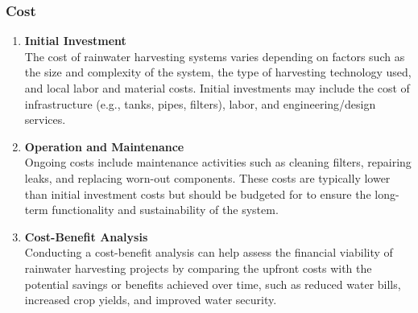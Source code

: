 \documentclass[12pt]{article}
\begin{document}
	\subsubsection{Cost}
	\begin{enumerate}[label=\textbf{\arabic*.}]
		\item \textbf{Initial Investment} \\
		The cost of rainwater harvesting systems varies depending on factors such as the size and complexity of the system, the type of harvesting technology used, and local labor and material costs. Initial investments may include the cost of infrastructure (e.g., tanks, pipes, filters), labor, and engineering/design services.

		\item \textbf{Operation and Maintenance} \\
		Ongoing costs include maintenance activities such as cleaning filters, repairing leaks, and replacing worn-out components. These costs are typically lower than initial investment costs but should be budgeted for to ensure the long-term functionality and sustainability of the system.
		 \newpage
		\item \textbf{Cost-Benefit Analysis} \\
		Conducting a cost-benefit analysis can help assess the financial viability of rainwater harvesting projects by comparing the upfront costs with the potential savings or benefits achieved over time, such as reduced water bills, increased crop yields, and improved water security.
	\end{enumerate}
\end{document}
